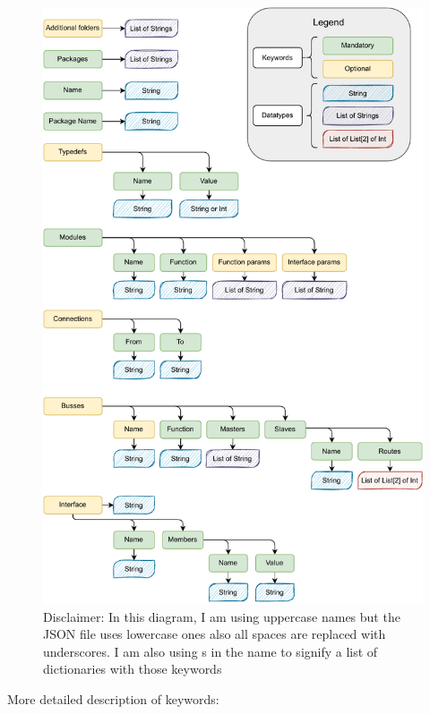 \documentclass[12pt]{report}
\begin{document}
\begin{figure}[!h]
    \centering
\includegraphics[width=0.75\columnwidth]{pdfExports/LargeMapJSON.pdf}

\caption{Disclaimer: In this diagram, I am using uppercase names but the JSON file uses lowercase ones also all spaces are replaced with underscores. I am also using s in the name to signify a list of dictionaries with those keywords}

\end{figure}
\newpage
More detailed description of keywords: 
\end{document}

